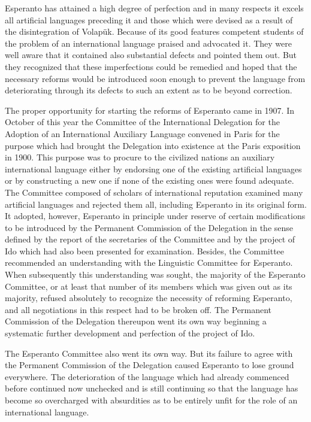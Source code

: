 Esperanto has attained a high degree of perfection and in many respects it excels all artificial languages preceding it and those which were devised as a result of the disintegration of Volapük. Because of its good features competent students of the problem of an international language praised and advocated it. They were well aware that it contained also substantial defects and pointed them out. But they recognized that these imperfections could be remedied and hoped that the necessary reforms would be introduced soon enough to prevent the language from deteriorating through its defects to such an extent as to be beyond correction. 

The proper opportunity for starting the reforms of Esperanto came in 1907. In October of this year the Committee of the International Delegation for the Adoption of an International Auxiliary Language convened in Paris for the purpose which had brought the Delegation into existence at the Paris exposition in 1900. This purpose was to procure to the civilized nations an auxiliary international language either by endorsing one of the existing artificial languages or by constructing a new one if none of the existing ones were found adequate. The Committee composed of scholars of international reputation examined many artificial languages and rejected them all, including Esperanto in its original form. It adopted, however, Esperanto in principle under reserve of certain modifications to be introduced by the Permanent Commission of the Delegation in the sense defined by the report of the secretaries of the Committee and by the project of Ido which had also been presented for examination. Besides, the Committee recommended an understanding with the Linguistic Committee for Esperanto. When subsequently this understanding was sought, the majority of the Esperanto Committee, or at least that number of its members which was given out as its majority, refused absolutely to recognize the necessity of reforming Esperanto, and all negotiations in this respect had to be broken off. The Permanent Commission of the Delegation thereupon went its own way beginning a systematic further development and perfection of the project of Ido. 

The Esperanto Committee also went its own way. But its failure to agree with the Permanent Commission of the Delegation caused Esperanto to lose ground everywhere. The deterioration of the language which had already commenced before continued now unchecked and is still continuing so that the language has become so overcharged with absurdities as to be entirely unfit for the role of an international language. 

